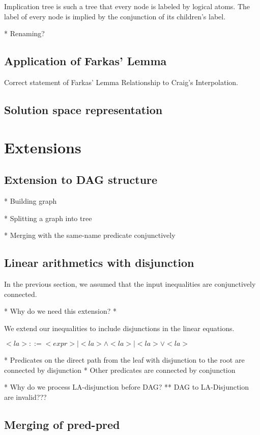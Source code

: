 \documentclass[a4paper,12pt]{article}
\begin{document}
Implication tree is such a tree that every node is labeled by logical
atoms. The label of every node is implied by the conjunction of its
children's label.


* Renaming?

\subsection{Application of Farkas' Lemma}

Correct statement of Farkas' Lemma
Relationship to Craig's Interpolation.

\subsection{Solution space representation}


\section{Extensions}

\subsection{Extension to DAG structure}

* Building graph

* Splitting a graph into tree

* Merging with the same-name predicate conjunctively

\subsection{Linear arithmetics with disjunction}

In the previous section, we assumed that the input inequalities are
conjunctively connected.

* Why do we need this extension? *

We extend our inequalities to include disjunctions in the linear
equations.

$ <la> ::= <expr>
         | <la> \wedge <la>
         | <la> \vee <la> $


* Predicates on the direct path from the leaf with disjunction to the
root are connected by disjunction
* Other predicates are connected by conjunction


* Why do we process LA-disjunction before DAG?
** DAG to LA-Disjunction are invalid???


\subsection{Merging of pred-pred}
\end{document}
